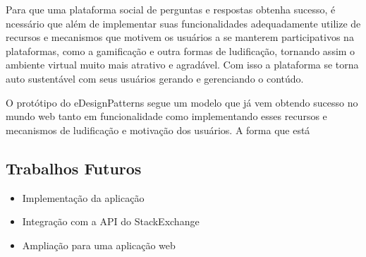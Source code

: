 Para que uma plataforma social de perguntas e respostas obtenha sucesso, é ncessário que além de implementar suas funcionalidades adequadamente
 utilize de recursos e mecanismos que motivem os usuários a se manterem participativos na plataformas, como a gamificação e outra formas de
 ludificação, tornando assim o ambiente virtual muito mais atrativo e agradável. Com isso a plataforma se torna auto sustentável com seus usuários
 gerando e gerenciando o contúdo.

O protótipo do eDesignPatterns segue um modelo que já vem obtendo sucesso no mundo web tanto em funcionalidade como implementando esses recursos
 e mecanismos de ludificação e motivação dos usuários. A forma que está 

\subsection{Trabalhos Futuros}

\begin{itemize}
 \item Implementação da aplicação
 \item Integração com a API do StackExchange
 \item Ampliação para uma aplicação web
\end{itemize}

